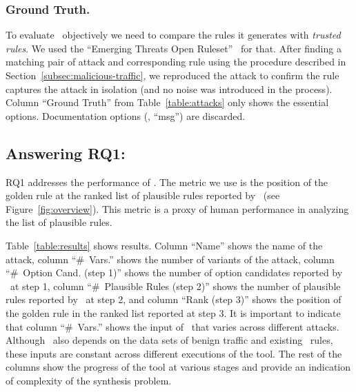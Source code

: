 \documentclass[sigconf,review, anonymous]{acmart}
\begin{document}

\subsubsection{Ground Truth.}To evaluate \tname\ objectively we need
to compare the rules it generates with \emph{trusted rules}. We used
the ``Emerging Threats Open Ruleset''~\cite{emerging-threats-open} for
that. After finding a matching pair of attack and corresponding rule
using the procedure described in
Section~\ref{subsec:malicious-traffic}, we reproduced the attack to
confirm the rule captures the attack in isolation (and no noise was
introduced in the process). Column ``Ground Truth'' from
Table~\ref{table:attacks} only shows the essential
options. Documentation options (\eg{}, ``msg'') are discarded.

\subsection{Answering RQ1: \textRQone}
\label{sec:answer-rqone}

RQ1 addresses the performance of \tname. The metric we use is the
position of the golden rule at the ranked list of plausible rules
reported by \tname\ (see Figure~\ref{fig:overview}). This metric is a
proxy of human performance in analyzing the list of plausible rules.


Table~\ref{table:results} shows results. Column ``Name'' shows the
name of the attack, column ``\#~Vars.'' shows the number of variants
of the attack, column ``\#~Option Cand. (step 1)'' shows the number of
option candidates reported by \tname\ at step 1, column ``\#~Plausible
Rules (step 2)'' shows the number of plausible rules reported by
\tname\ at step 2, and column ``Rank (step 3)'' shows the position of the
golden rule in the ranked list reported at step 3.
It is important to indicate that column ``\#~Vars.'' shows the input of
\tname\ that varies across different attacks. Although \tname\ also
depends on the data sets of benign traffic and existing \suri\ rules,
these inputs are constant across different executions of the tool. The
rest of the columns show the progress of the tool at various stages
and provide an indication of complexity of the synthesis problem.
\end{document}

